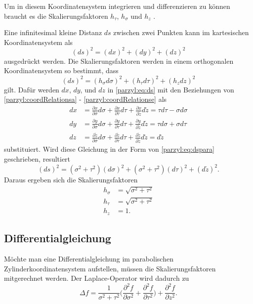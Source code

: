 Um in diesem Koordinatensystem integrieren und differenzieren zu 
können braucht es die Skalierungsfaktoren $h_{\tau}$, $h_{\sigma}$ und $h_{z}$ \cite{parzyl:scalefac}.
%

Eine infinitesimal kleine Distanz $ds$ zwischen zwei Punkten
kann im kartesischen Koordinatensystem als
\begin{equation}
    (ds)^2 = (dx)^2 + (dy)^2 + (dz)^2
    \label{parzyl:eq:ds}
\end{equation}
ausgedrückt werden.
Die Skalierungsfaktoren werden in einem orthogonalen Koordinatensystem so bestimmt, dass
\begin{equation}
    (ds)^2 = (h_{\sigma}d\sigma)^2 + 
    (h_{\tau}d\tau)^2 + (h_z dz)^2
\label{parzyl:eq:dspara}
\end{equation}
gilt.
Dafür werden $dx$, $dy$, und $dz$ in \eqref{parzyl:eq:ds} mit den Beziehungen
von \eqref{parzyl:coordRelationsa} - \eqref{parzyl:coordRelationse} als
\begin{align}
    dx  &= \frac{\partial x }{\partial \sigma} d\sigma + 
        \frac{\partial x }{\partial \tau} d\tau + 
        \frac{\partial x }{\partial \tilde{z}} d \tilde{z} 
        = \tau d\tau - \sigma d \sigma \\
    dy &= \frac{\partial y }{\partial \sigma} d\sigma + 
        \frac{\partial y }{\partial \tau} d\tau +
        \frac{\partial y }{\partial \tilde{z}} d \tilde{z} 
        = \tau d\sigma + \sigma d \tau  \\
    dz &= \frac{\partial \tilde{z} }{\partial \sigma} d\sigma + 
        \frac{\partial \tilde{z} }{\partial \tau} d\tau +
        \frac{\partial \tilde{z} }{\partial \tilde{z}} d \tilde{z} 
        = d \tilde{z}
\end{align}
substituiert.
Wird diese Gleichung in der Form von \eqref{parzyl:eq:dspara}
geschrieben, resultiert
\begin{equation}
    (d s)^2 = 
        (\sigma^2 + \tau^2)(d\sigma)^2 + 
        (\sigma^2 + \tau^2)(d\tau)^2 +
        (d \tilde{z})^2.
\end{equation}
Daraus ergeben sich die Skalierungsfaktoren 
\begin{align}
    h_{\sigma} &= \sqrt{\sigma^2 + \tau^2}\\
    h_{\tau} &= \sqrt{\sigma^2 + \tau^2}\\
    h_{z} &= 1.
\end{align}
\subsection{Differentialgleichung}
Möchte man eine Differentialgleichung im parabolischen 
Zylinderkoordinatensystem aufstellen, müssen die Skalierungsfaktoren
mitgerechnet werden.
Der Laplace-Operator wird dadurch zu
\begin{equation}
    \Delta f = \frac{1}{\sigma^2 + \tau^2} 
        \biggl( 
            \frac{\partial^2 f}{\partial \sigma ^2} +
            \frac{\partial^2 f}{\partial \tau ^2}
        \biggr)
        + \frac{\partial^2 f}{\partial z^2}.
    \label{parzyl:eq:laplaceInParZylCor}
\end{equation}
